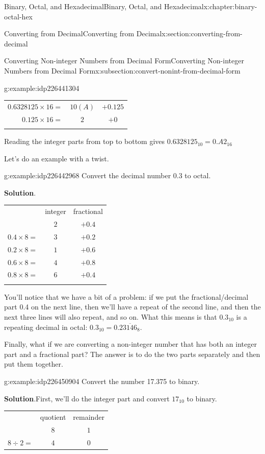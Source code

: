 \documentclass[twoside,10pt,]{book}
\newcommand{\blocktitlefont}{\relax}
\newcommand{\tabularfont}{\relax}
\numberwithin{equation}{section}
\newcommand{\hrulemedium}{\noalign{\hrule height 0.07em}}
\newcommand{\hrulethick} {\noalign{\hrule height 0.11em}}
\begin{document}
\begin{chapterptx}{Binary, Octal, and Hexadecimal}{}{Binary, Octal, and Hexadecimal}{}{}{x:chapter:binary-octal-hex}
\begin{sectionptx}{Converting from Decimal}{}{Converting from Decimal}{}{}{x:section:converting-from-decimal}
\begin{subsectionptx}{Converting Non-integer Numbers from Decimal Form}{}{Converting Non-integer Numbers from Decimal Form}{}{}{x:subsection:convert-nonint-from-decimal-form}
\begin{example}{}{g:example:idp226441304}
\begin{center}
{\begin{tabular}{ccc}
\multicolumn{1}{r}{\(0.6328125\times 16=\)}&\(10 (A)\)&\(+0.125\)\tabularnewline[0pt]
\multicolumn{1}{r}{\(0.125\times 16=\)}&\(2\)&\(+0\)\tabularnewline\hrulethick
\end{tabular}
}%
\end{center}%
 Reading the integer parts from top to bottom gives \(0.6328125_{10}=0.A2_{16}\)\end{example}
Let's do an example with a twist.%
\begin{example}{}{g:example:idp226442968}%
Convert the decimal number 0.3 to octal.\par\smallskip%
\noindent\textbf{\blocktitlefont Solution}.\label{g:solution:idp226443480}{}\hypertarget{g:solution:idp226443480}{}\quad{}\begin{center}%
{\tabularfont%
\begin{tabular}{ccc}\hrulethick
&integer&fractional\tabularnewline\hrulemedium
\multicolumn{1}{r}{\(0.3\times 8=\)}&\(2\)&\(+0.4\)\tabularnewline[0pt]
\multicolumn{1}{r}{\(0.4\times 8=\)}&\(3\)&\(+0.2\)\tabularnewline[0pt]
\multicolumn{1}{r}{\(0.2\times 8=\)}&\(1\)&\(+0.6\)\tabularnewline[0pt]
\multicolumn{1}{r}{\(0.6\times 8=\)}&\(4\)&\(+0.8\)\tabularnewline[0pt]
\multicolumn{1}{r}{\(0.8\times 8=\)}&\(6\)&\(+0.4\)\tabularnewline\hrulethick
\end{tabular}
}%
\end{center}%
You'll notice that we have a bit of a problem:  if we put the fractional\slash{}decimal part 0.4 on the next line, then we'll have a repeat of the second line, and then the next three lines will also repeat, and so on.  What this means is that \(0.3_{10}\) is a repeating decimal in octal: \(0.3_{10}=0.2\overline{3146}_8\).%
\end{example}
Finally, what if we are converting a non-integer number that has both an integer part and a fractional part?  The answer is to do the two parts separately and then put them together.%
\begin{example}{}{g:example:idp226450904}%
Convert the number 17.375 to binary.\par\smallskip%
\noindent\textbf{\blocktitlefont Solution}.\label{g:solution:idp226453464}{}\hypertarget{g:solution:idp226453464}{}\quad{}First, we'll do the integer part and convert \(17_{10}\) to binary. \begin{center}%
{\tabularfont%
\begin{tabular}{ccc}\hrulethick
&quotient&remainder\tabularnewline\hrulemedium
\multicolumn{1}{r}{\(17\div 2=\)}&\(8\)&\(1\)\tabularnewline[0pt]
\multicolumn{1}{r}{\(8\div 2=\)}&\(4\)&\(0\)\tabularnewline[0pt]

\end{tabular}}
\end{center}
\end{example}
\end{subsectionptx}
\end{sectionptx}
\end{chapterptx}
\end{document}
